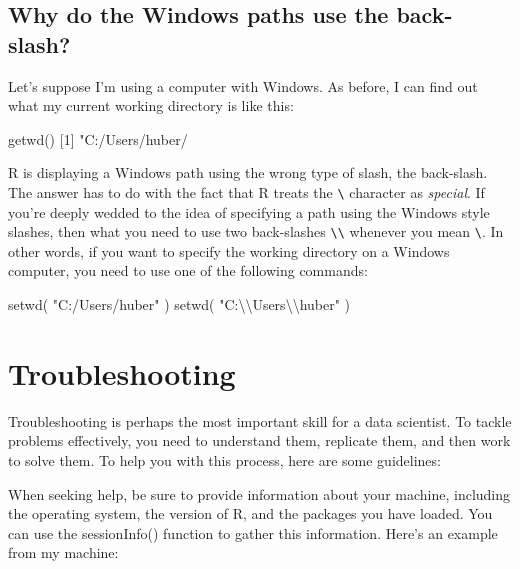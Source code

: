\documentclass[
  12pt,
  oneside]{book}
\newenvironment{Shaded}{\begin{snugshade}}{\end{snugshade}}
\newcommand{\DecValTok}[1]{\textcolor[rgb]{0.00,0.00,0.81}{#1}}
\newcommand{\FunctionTok}[1]{\textcolor[rgb]{0.00,0.00,0.00}{#1}}
\newcommand{\NormalTok}[1]{#1}
\newcommand{\SpecialCharTok}[1]{\textcolor[rgb]{0.00,0.00,0.00}{#1}}
\newcommand{\StringTok}[1]{\textcolor[rgb]{0.31,0.60,0.02}{#1}}
\theoremstyle{definition}
\theoremstyle{definition}
\theoremstyle{definition}
\theoremstyle{definition}
\theoremstyle{remark}
\begin{document}
\hypertarget{sec:winbackslash}{%
\subsection{Why do the Windows paths use the back-slash?}\label{sec:winbackslash}}

Let's suppose I'm using a computer with Windows. As before, I can find out what my current working directory is like this:

\begin{Shaded}
\begin{Highlighting}[]
\FunctionTok{getwd}\NormalTok{()}
\NormalTok{[}\DecValTok{1}\NormalTok{] }\StringTok{"C:/Users/huber/}
\end{Highlighting}
\end{Shaded}

R is displaying a Windows path using the wrong type of slash, the back-slash. The answer has to do with the fact that R treats the \texttt{\textbackslash{}} character as \emph{special}. If you're deeply wedded to the idea of specifying a path using the Windows style slashes, then what you need to use two back-slashes \texttt{\textbackslash{}\textbackslash{}} whenever you mean \texttt{\textbackslash{}}. In other words, if you want to specify the working directory on a Windows computer, you need to use one of the following commands:

\begin{Shaded}
\begin{Highlighting}[]
\FunctionTok{setwd}\NormalTok{( }\StringTok{"C:/Users/huber"}\NormalTok{ )}
\FunctionTok{setwd}\NormalTok{( }\StringTok{"C:}\SpecialCharTok{\textbackslash{}\textbackslash{}}\StringTok{Users}\SpecialCharTok{\textbackslash{}\textbackslash{}}\StringTok{huber"}\NormalTok{ )}
\end{Highlighting}
\end{Shaded}

\hypertarget{troubleshooting}{%
\section{Troubleshooting}\label{troubleshooting}}

Troubleshooting is perhaps the most important skill for a data scientist. To tackle problems effectively, you need to understand them, replicate them, and then work to solve them. To help you with this process, here are some guidelines:

When seeking help, be sure to provide information about your machine, including the operating system, the version of R, and the packages you have loaded. You can use the sessionInfo() function to gather this information. Here's an example from my machine:
\end{document}
